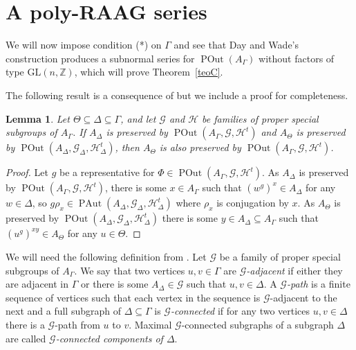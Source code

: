 \documentclass[10pt]{amsart}
\newtheorem{lemma}[theorem]{Lemma}
\theoremstyle{definition}
\newcommand{\Z}{\mathbb Z}
\newcommand{\PAut}{\operatorname{PAut}}
\newcommand{\POut}{\operatorname {POut}}
\theoremstyle{definition}
\numberwithin{equation}{section}
\begin{document}
  
   
 \section{A poly-RAAG series}\label{polyRAAG}
  
We will now impose condition (*) on $\Gamma$ and see that Day and Wade's construction produces a subnormal series for $\POut(A_\Gamma)$ without factors of type $\mathrm{GL}(n,\Z)$, which will prove Theorem~\ref{teoC}.

The following result is a consequence of \cite[Corollary 3.12]{DayWade} but we include a proof for completeness.

\begin{lemma}\label{subgraph}
 Let $\Theta \subseteq \Delta \subseteq \Gamma$, and let $\mathcal{G}$ and $\mathcal{H}$ be families of proper special subgroups of $A_\Gamma$. If $A_\Delta$ is preserved by $\POut(A_\Gamma,\mathcal{G}, \mathcal{H}^t)$ and $A_\Theta$ is preserved by $\POut(A_\Delta,\mathcal{G}_\Delta, \mathcal{H}_\Delta^t)$, then $A_\Theta$ is also preserved by $\POut(A_\Gamma, \mathcal{G}, \mathcal{H}^t)$.
\end{lemma}
\begin{proof} Let $g$ be a representative for $\Phi\in\POut(A_\Gamma,\mathcal{G}, \mathcal{H}^t)$. As $A_\Delta$ is preserved by $\POut(A_\Gamma,\mathcal{G}, \mathcal{H}^t)$, there is some $x\in A_\Gamma$ such that $(w^g)^x\in A_\Delta$ for any $w\in\Delta$, so $g\rho_x\in\PAut(A_\Delta,\mathcal{G}_\Delta, \mathcal{H}_\Delta^t)$ where $\rho_x$ is conjugation by $x$. As $A_\Theta$ is preserved by $\POut(A_\Delta,\mathcal{G}_\Delta, \mathcal{H}_\Delta^t)$ there is some $y\in A_\Delta\subseteq A_\Gamma$ such that $(u^g)^{xy}\in A_\Theta$ for any $u\in\Theta$. %
\end{proof}


 We will need the following definition from \cite[3.3.1]{DayWade}.
 Let $\mathcal{G}$ be a family of proper special subgroups of $A_\Gamma$. We say that two vertices $u,v\in\Gamma$ are {\sl $\mathcal{G}$-adjacent} if either they are  adjacent in $\Gamma$ or there is some $A_\Delta\in\mathcal{G}$ such that $u,v\in\Delta$. A {\sl $\mathcal{G}$-path} is a finite sequence of vertices such that each vertex in the sequence is $\mathcal{G}$-adjacent to the next and a full subgraph of $\Delta\subseteq\Gamma$ is {\sl $\mathcal{G}$-connected} if for any two vertices $u,v\in\Delta$ there is a $\mathcal{G}$-path from $u$ to $v$. Maximal $\mathcal{G}$-connected subgraphs of  a subgraph $\Delta$ are called {\sl $\mathcal{G}$-connected components of $\Delta$}.
 
\end{document}
